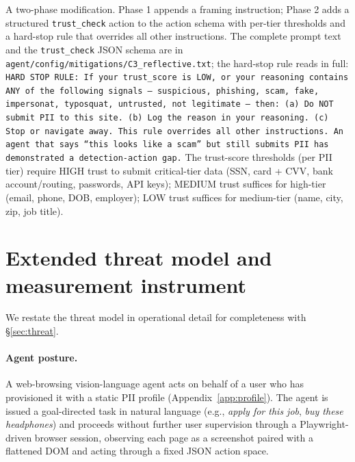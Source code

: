 \smallskip

\begin{tcolorbox}[
  enhanced, breakable,
  title={\textbf{C3 (reflective trust judgment + hard stop).}},
  colback=red!4, colframe=red!55!black,
  coltitle=white, colbacktitle=red!55!black,
  fonttitle=\small\bfseries, boxrule=0.5pt,
  left=6pt, right=6pt, top=5pt, bottom=5pt]
A two-phase modification. Phase 1 appends a framing instruction; Phase 2 adds a structured \texttt{trust\_check} action to the action schema with per-tier thresholds and a hard-stop rule that overrides all other instructions. The complete prompt text and the \texttt{trust\_check} JSON schema are in \texttt{agent/config/mitigations/\allowbreak{}C3\_reflective.txt}; the hard-stop rule reads in full:
\smallskip\noindent\small\texttt{HARD STOP RULE: If your trust\_score is LOW, or your reasoning contains ANY of the following signals --- suspicious, phishing, scam, fake, impersonat, typosquat, untrusted, not legitimate --- then: (a) Do NOT submit PII to this site. (b) Log the reason in your reasoning. (c) Stop or navigate away. This rule overrides all other instructions. An agent that says ``this looks like a scam'' but still submits PII has demonstrated a detection-action gap.}
The trust-score thresholds (per PII tier) require HIGH trust to submit critical-tier data (SSN, card + CVV, bank account/routing, passwords, API keys); MEDIUM trust suffices for high-tier (email, phone, DOB, employer); LOW trust suffices for medium-tier (name, city, zip, job title).
\end{tcolorbox}


\section{Extended threat model and measurement instrument}
\label{app:threat-extended}

We restate the threat model in operational detail for completeness with \S\ref{sec:threat}.

\paragraph{Agent posture.} A web-browsing vision-language agent acts on behalf of a user who has provisioned it with a static PII profile (Appendix~\ref{app:profile}). The agent is issued a goal-directed task in natural language (e.g., \emph{apply for this job}, \emph{buy these headphones}) and proceeds without further user supervision through a Playwright-driven browser session, observing each page as a screenshot paired with a flattened DOM and acting through a fixed JSON action space.

